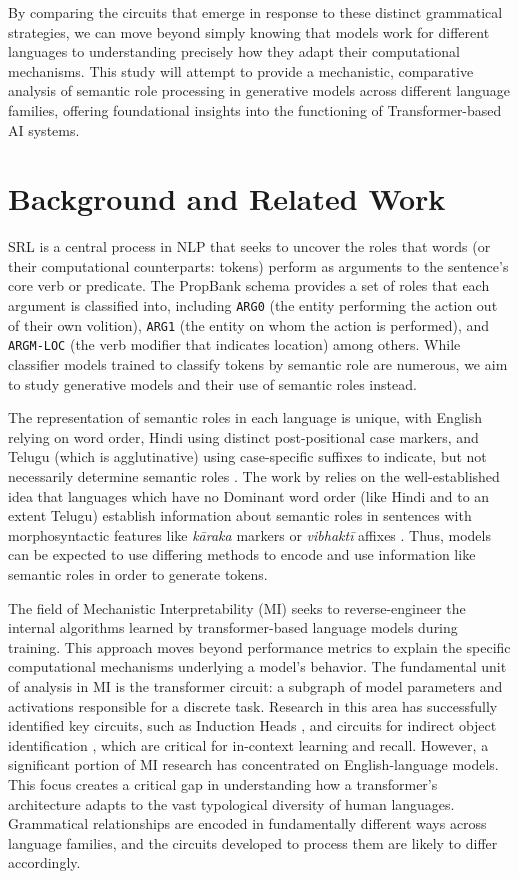 \documentclass[11pt]{article}
\begin{document}
By comparing the circuits that emerge in response to these distinct grammatical strategies, we can move beyond simply knowing that models work for different languages to understanding precisely how they adapt their computational mechanisms. This study will attempt to provide a mechanistic, comparative analysis of semantic role processing in generative models across different language families, offering foundational insights into the functioning of Transformer-based AI systems.
\section*{Background and Related Work}
\label{sec:orgf24a0fb}

SRL is a central process in NLP that seeks to uncover the roles that words (or their computational counterparts: tokens) perform as arguments to the sentence's core verb or predicate. The PropBank \citep{10.1162/0891201053630264} schema provides a set of roles that each argument is classified into, including \texttt{ARG0} (the entity performing the action out of their own volition), \texttt{ARG1} (the entity on whom the action is performed), and \texttt{ARGM-LOC} (the verb modifier that indicates location) among others. While classifier models trained to classify tokens by semantic role are numerous, we aim to study generative models and their use of semantic roles instead.

The representation of semantic roles in each language is unique, with English relying on word order, Hindi using distinct post-positional case markers, and Telugu (which is agglutinative) using case-specific suffixes to indicate, but not necessarily determine semantic roles \citep{vaidya-etal-2011-analysis}.
The work by \citet{ghosh.etal2024} relies on the well-established idea that languages which have no Dominant word order (like Hindi and to an extent Telugu) establish information about semantic roles in sentences with morphosyntactic features like \emph{kāraka} markers or \emph{vibhaktī} affixes \citep{vaidya-etal-2011-analysis}. Thus, models can be expected to use differing methods to encode and use information like semantic roles in order to generate tokens.

The field of Mechanistic Interpretability (MI) seeks to reverse-engineer the internal algorithms learned by transformer-based language models during training. This approach moves beyond performance metrics to explain the specific computational mechanisms underlying a model's behavior. The fundamental unit of analysis in MI is the transformer circuit: \citep{elhage2021mathematical} a subgraph of model parameters and activations responsible for a discrete task. Research in this area has successfully identified key circuits, such as Induction Heads \citep{olsson.etal2022}, and circuits for indirect object identification \citep{wang.etal2022}, which are critical for in-context learning and recall. However, a significant portion of MI research has concentrated on English-language models. This focus creates a critical gap in understanding how a transformer's architecture adapts to the vast typological diversity of human languages. Grammatical relationships are encoded in fundamentally different ways across language families, and the circuits developed to process them are likely to differ accordingly.
\end{document}
